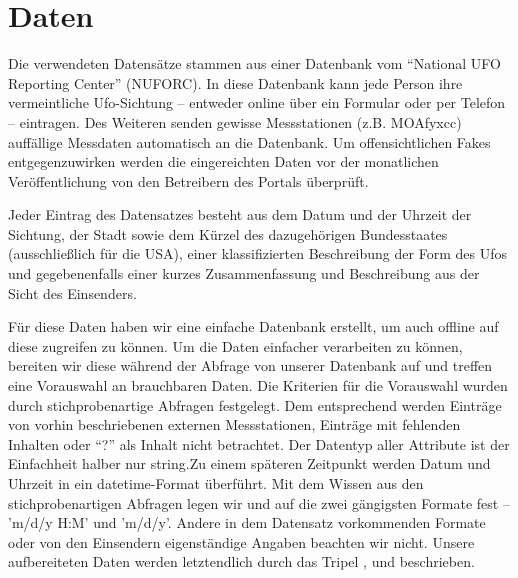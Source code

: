 \section{Daten} \label{data}

Die verwendeten Datensätze stammen aus einer Datenbank vom \enquote{National UFO Reporting Center} (NUFORC). In diese Datenbank kann jede Person ihre vermeintliche Ufo-Sichtung -- entweder online über ein Formular oder per Telefon -- eintragen. Des Weiteren senden gewisse Messstationen (z.B. MOAfyxcc) auffällige Messdaten automatisch an die Datenbank. Um offensichtlichen Fakes entgegenzuwirken werden die eingereichten Daten vor der monatlichen Veröffentlichung von den Betreibern des Portals überprüft.

Jeder Eintrag des Datensatzes besteht aus dem Datum und der Uhrzeit der Sichtung, der Stadt sowie dem Kürzel des dazugehörigen Bundesstaates (ausschließlich für die USA), einer klassifizierten Beschreibung der Form des Ufos und gegebenenfalls einer kurzes Zusammenfassung und Beschreibung aus der Sicht des Einsenders.

Für diese Daten haben wir eine einfache Datenbank erstellt, um auch offline auf diese zugreifen zu können. Um die Daten einfacher verarbeiten zu können, bereiten wir diese während der Abfrage von unserer Datenbank auf und treffen eine Vorauswahl an brauchbaren Daten. Die Kriterien für die Vorauswahl wurden durch stichprobenartige Abfragen festgelegt. Dem entsprechend werden Einträge von vorhin beschriebenen externen Messstationen, Einträge mit fehlenden Inhalten oder \enquote{?} als Inhalt nicht betrachtet. Der Datentyp aller Attribute ist der Einfachheit halber nur string.Zu einem späteren Zeitpunkt werden Datum und Uhrzeit in ein datetime-Format überführt. Mit dem Wissen aus den stichprobenartigen Abfragen legen wir und auf die zwei gängigsten Formate fest -- 'm/d/y H:M' und 'm/d/y'. Andere in dem Datensatz vorkommenden Formate oder von den Einsendern eigenständige Angaben beachten wir nicht. Unsere aufbereiteten Daten werden letztendlich durch das Tripel ,  und  beschrieben.